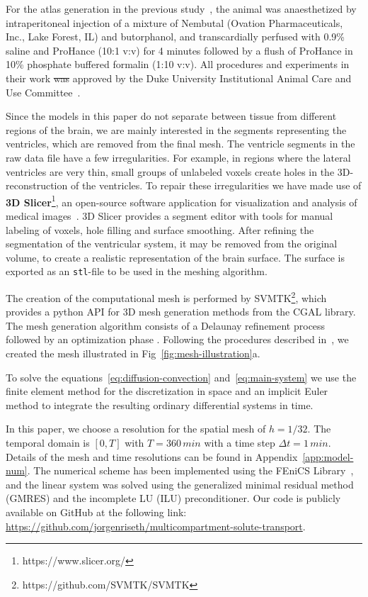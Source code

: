 \documentclass[10pt]{article}
\newcommand{\1}{^{(1)}}
\newcommand{\2}{^{(2)}}
\newcommand {\dt}   {\Delta t}
\providecommand{\DIFaddtex}[1]{{\protect\color{blue}\uwave{#1}}} %
\providecommand{\DIFdeltex}[1]{{\protect\color{red}\sout{#1}}}                      %
\providecommand{\DIFaddbegin}{} %
\providecommand{\DIFaddend}{} %
\providecommand{\DIFdelbegin}{} %
\providecommand{\DIFdelend}{} %
\providecommand{\DIFadd}[1]{\texorpdfstring{\DIFaddtex{#1}}{#1}} %
\providecommand{\DIFdel}[1]{\texorpdfstring{\DIFdeltex{#1}}{}} %
\newcommand{\DIFscaledelfig}{0.5}
\newlength{\DIFdelgraphicswidth} %
\newlength{\DIFdelgraphicsheight} %
\newcommand{\DIFaddincludegraphics}[2][]{{\color{blue}\fbox{\DIFOincludegraphics[#1]{#2}}}} %
\newcommand{\DIFdelincludegraphics}[2][]{%
\sbox{\DIFdelgraphicsbox}{\DIFOincludegraphics[#1]{#2}}%
\settoboxwidth{\DIFdelgraphicswidth}{\DIFdelgraphicsbox} %
\settoboxtotalheight{\DIFdelgraphicsheight}{\DIFdelgraphicsbox} %
\scalebox{\DIFscaledelfig}{%
\parbox[b]{\DIFdelgraphicswidth}{\usebox{\DIFdelgraphicsbox}\\[-\baselineskip] \rule{\DIFdelgraphicswidth}{0em}}\llap{\resizebox{\DIFdelgraphicswidth}{\DIFdelgraphicsheight}{%
\setlength{\unitlength}{\DIFdelgraphicswidth}%
\begin{picture}(1,1)%
\thicklines\linethickness{2pt} %
{\color[rgb]{1,0,0}\put(0,0){\framebox(1,1){}}}%
{\color[rgb]{1,0,0}\put(0,0){\line( 1,1){1}}}%
{\color[rgb]{1,0,0}\put(0,1){\line(1,-1){1}}}%
\end{picture}%
}\hspace*{3pt}}} %
} %
\DeclareRobustCommand{\DIFaddbegin}{\DIFOaddbegin \let\includegraphics\DIFaddincludegraphics} %
\DeclareRobustCommand{\DIFaddend}{\DIFOaddend \let\includegraphics\DIFOincludegraphics} %
\DeclareRobustCommand{\DIFdelbegin}{\DIFOdelbegin \let\includegraphics\DIFdelincludegraphics} %
\DeclareRobustCommand{\DIFdelend}{\DIFOaddend \let\includegraphics\DIFOincludegraphics} %
\begin{document}
For the atlas generation in the previous study~\cite{papp2014}, the animal was anaesthetized by intraperitoneal injection of a mixture of Nembutal (Ovation Pharmaceuticals, Inc., Lake Forest, IL) and butorphanol, and transcardially perfused with 0.9\% saline and ProHance (10:1 v:v) for 4 minutes followed by a flush of ProHance in 10\% phosphate buffered formalin (1:10 v:v). All procedures and experiments in their work \DIFdelbegin \DIFdel{was }\DIFdelend \DIFaddbegin \DIFadd{were }\DIFaddend approved by the Duke University Institutional Animal Care and Use Committee~\cite{papp2014}.

Since the models in this paper do not separate between tissue from different regions of the brain, we are mainly interested in the segments representing the ventricles, which are removed from the final mesh. The ventricle segments in the raw data file have a few irregularities. For example, in regions where the lateral ventricles are very thin, small groups of unlabeled voxels create holes in the 3D-reconstruction of the ventricles. To repair these irregularities we have made use of \textbf{3D Slicer}\footnote{https://www.slicer.org/}, an open-source software application for visualization and analysis of medical images~\cite{fedorov2012}. 3D Slicer provides a segment editor with tools for manual labeling of voxels, hole filling and surface smoothing. After refining the segmentation of the ventricular system, it may be removed from the original volume, to create a realistic representation of the brain surface. The surface is exported as an \texttt{stl}-file to be used in the meshing algorithm.  

The creation of the computational mesh is performed by SVMTK\footnote{https://github.com/SVMTK/SVMTK}, which provides a python API for 3D mesh generation methods from the CGAL library. The mesh generation algorithm consists of a Delaunay refinement process followed by an optimization phase \cite{cgal:rty-m3-22a}. Following the procedures described in~\cite{Mardal-2022-mri}, we created the mesh illustrated in Fig~\ref{fig:mesh-illustration}a.

To solve the equations~\eqref{eq:diffusion-convection} and~\eqref{eq:main-system} we use the finite element method for the discretization in space and an implicit Euler method to integrate the resulting ordinary differential systems in time. 

In this paper, we choose a resolution for the spatial mesh of $h=1/32$. The temporal domain is $[0,T]$ with $T=360 \, \si{min}$ with a time step $\dt = 1 \, \si{min}$. Details of the mesh and time resolutions can be found in Appendix~\ref{app:model-num}. The numerical scheme has been implemented using the FEniCS Library~\cite{alnaes2015fenics,LoggMardalEtAl2012}, and the linear system was solved using the generalized minimal residual method (GMRES) and the incomplete LU (ILU) preconditioner. Our code is publicly available on GitHub at the following link: \url{https://github.com/jorgenriseth/multicompartment-solute-transport}.
\end{document}
